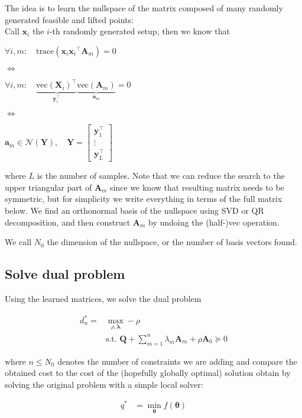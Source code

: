 \documentclass[11pt]{article}
\newcommand{\vc}[1]{\ensuremath{\bm{#1}}}
\begin{document}
The idea is to learn the nullspace of the matrix composed of many
randomly generated feasible and lifted points:\\
Call \(\vc{x}_{i}\) the \(i\)-th randomly generated setup, then we
know that

\(\forall i, m: \quad \text{trace}(\vc{x}_{i}{\vc{x}_{i}}^\top\vc{A}_m) = 0\)

\(\iff\)

\(\forall i, m: \quad \underbrace{\text{vec}(\vc{X}_{i})^\top}_{\vc{y}_{i}^\top} \underbrace{\text{vec}(\vc{A}_m)}_{\vc{a}_m} = 0\)

\(\iff\)

\(\vc{a}_m \in \mathcal{N}(\vc{Y}), \quad \vc{Y} = \begin{bmatrix} \vc{y}_1^{\top} \\ \vdots \\ \vc{y}_L^{\top}\end{bmatrix}\)

where \(L\) is the number of samples. Note that we can reduce the search
to the upper triangular part of \(\vc{A}_m\) since we know that
resulting matrix needs to be symmetric, but for simplicity we write
everything in terms of the full matrix below. We find an orthonormal
basis of the nullspace using SVD or QR decomposition, and then construct
\(\vc{A}_m\) by undoing the (half-)vec operation.

We call \(N_0\) the dimension of the nullspace, or the number of basis
vectors found.

\subsection{Solve dual problem}

Using the learned matrices, we solve the dual problem

\begin{align} 
d_n^* = &\max_{\rho, \vc{\lambda}} -\rho \\
&\text{s.t. } \vc{Q} + \sum_{m=1}^n \lambda_m \vc{A}_m + \rho \vc{A}_0 \succeq 0
\end{align}

where \(n \leq N_0\) denotes the number of constraints we are adding and
compare the obtained cost to the cost of the (hopefully globally
optimal) solution obtain by solving the original problem with a simple
local solver:

\begin{align}
q^* &= \min_{\vc{\theta}} f(\vc{\theta})
\end{align}
\end{document}
